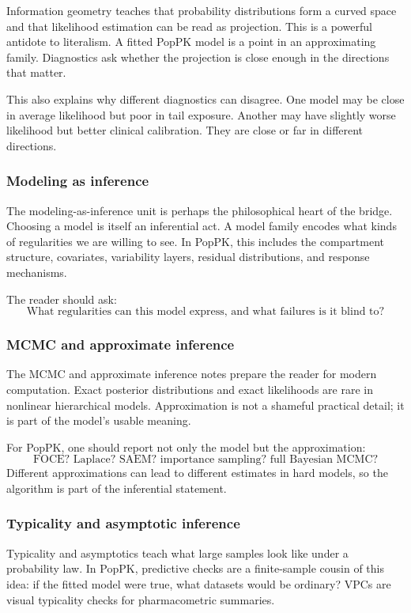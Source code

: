 Information geometry teaches that probability distributions form a curved space and that likelihood estimation can be read as projection.  This is a powerful antidote to literalism.  A fitted PopPK model is a point in an approximating family.  Diagnostics ask whether the projection is close enough in the directions that matter.

This also explains why different diagnostics can disagree.  One model may be close in average likelihood but poor in tail exposure.  Another may have slightly worse likelihood but better clinical calibration.  They are close or far in different directions.

\subsubsection*{Modeling as inference}

The modeling-as-inference unit is perhaps the philosophical heart of the bridge.  Choosing a model is itself an inferential act.  A model family encodes what kinds of regularities we are willing to see.  In PopPK, this includes the compartment structure, covariates, variability layers, residual distributions, and response mechanisms.

The reader should ask:
\[
  \text{What regularities can this model express, and what failures is it blind to?}
\]

\subsubsection*{MCMC and approximate inference}

The MCMC and approximate inference notes prepare the reader for modern computation.  Exact posterior distributions and exact likelihoods are rare in nonlinear hierarchical models.  Approximation is not a shameful practical detail; it is part of the model's usable meaning.

For PopPK, one should report not only the model but the approximation:
\[
  \text{FOCE? Laplace? SAEM? importance sampling? full Bayesian MCMC?}
\]
Different approximations can lead to different estimates in hard models, so the algorithm is part of the inferential statement.

\subsubsection*{Typicality and asymptotic inference}

Typicality and asymptotics teach what large samples look like under a probability law.  In PopPK, predictive checks are a finite-sample cousin of this idea: if the fitted model were true, what datasets would be ordinary?  VPCs are visual typicality checks for pharmacometric summaries.

